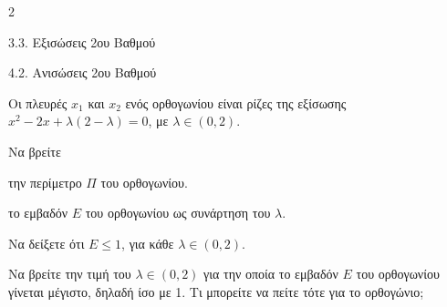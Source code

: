 \begin{ylh}{2}
    \item 3.3. Εξισώσεις 2ου Βαθμού
    \item 4.2. Ανισώσεις 2ου Βαθμού
\end{ylh}
Οι πλευρές $x_1$ και $x_2$ ενός ορθογωνίου είναι ρίζες της εξίσωσης $x^2 - 2x + \lambda(2 - \lambda) = 0$, με $\lambda \in (0, 2)$.

\begin{alist}
\item Να βρείτε

\begin{rlist}
\item την περίμετρο $\Pi$ του ορθογωνίου. 
\item το εμβαδόν $E$ του ορθογωνίου ως συνάρτηση του $\lambda$. 
\end{rlist}
\item Να δείξετε ότι $E \le 1$, για κάθε $\lambda \in (0, 2)$. 
\item Να βρείτε την τιμή του $\lambda \in (0, 2)$ για την οποία το εμβαδόν $E$ του ορθογωνίου γίνεται μέγιστο, δηλαδή ίσο με 1. Τι μπορείτε να πείτε τότε για το ορθογώνιο; 
\end{alist}

